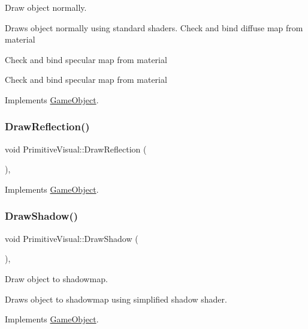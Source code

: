 Draw object normally. 

Draws object normally using standard shaders. Check and bind diffuse map from material

Check and bind specular map from material

Check and bind specular map from material 

Implements \mbox{\hyperlink{class_game_object_a29a665f46fda87982825bc5c0ca6a888}{Game\+Object}}.

\mbox{\label{class_primitive_visual_a474e31c4bcf99e49da2ea943d6f25746}} 
\subsubsection{\texorpdfstring{DrawReflection()}{DrawReflection()}}
{\footnotesize\ttfamily void Primitive\+Visual\+::\+Draw\+Reflection (\begin{DoxyParamCaption}{ }\end{DoxyParamCaption})\hspace{0.3cm}{\ttfamily [override]}, {\ttfamily [virtual]}}



Implements \mbox{\hyperlink{class_game_object_ad28240509bb63e4fde243e842898cf30}{Game\+Object}}.

\mbox{\label{class_primitive_visual_a67915de082572ca4f6467c1402587024}} 
\subsubsection{\texorpdfstring{DrawShadow()}{DrawShadow()}}
{\footnotesize\ttfamily void Primitive\+Visual\+::\+Draw\+Shadow (\begin{DoxyParamCaption}{ }\end{DoxyParamCaption})\hspace{0.3cm}{\ttfamily [override]}, {\ttfamily [virtual]}}



Draw object to shadowmap. 

Draws object to shadowmap using simplified shadow shader. 

Implements \mbox{\hyperlink{class_game_object_a78bf45c8ef3805247435583556087788}{Game\+Object}}.



